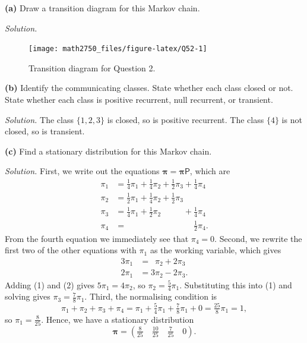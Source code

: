 \documentclass[
  a4paper,
]{article}
\theoremstyle{definition}
\theoremstyle{definition}
\theoremstyle{definition}
\theoremstyle{remark}
\begin{document}
\textbf{(a)} Draw a transition diagram for this Markov chain.

\begin{myanswers}

\emph{Solution.}

\begin{figure}

{\centering \texttt{[image: math2750\_files/figure-latex/Q52-1]} 

}

\caption{Transition diagram for Question 2.}\label{fig:Q52}
\end{figure}

\end{myanswers}

\textbf{(b)} Identify the communicating classes. State whether each class closed or not. State whether each class is positive recurrent, null recurrent, or transient.

\begin{myanswers}
\emph{Solution.} The class \(\{1,2,3\}\) is closed, so is positive recurrent. The class \(\{4\}\) is not closed, so is transient.

\end{myanswers}

\textbf{(c)} Find a stationary distribution for this Markov chain.

\begin{myanswers}
\emph{Solution.} First, we write out the equations \(\boldsymbol\pi = \boldsymbol\pi\mathsf P\), which are
\begin{align*}
\pi_1 &= \tfrac14\pi_1 + \tfrac14\pi_2 + \tfrac12\pi_3 + \tfrac14\pi_4 \\
\pi_2 &= \tfrac12\pi_1 + \tfrac14\pi_2 + \tfrac12\pi_3 \\
\pi_3 &= \tfrac14\pi_1 + \tfrac12\pi_2 \phantom{{}+\tfrac12\pi_3} + \tfrac14\pi_4 \\
\pi_4 &= \phantom{\tfrac12\pi_1 + \tfrac14\pi_2 + \tfrac12\pi_3+{}}  \tfrac12 \pi_4 .
\end{align*}
From the fourth equation we immediately see that \(\pi_4 = 0\). Second, we rewrite the first two of the other equations with \(\pi_1\) as the working variable, which gives
\begin{align}
3\pi_1 &= \phantom{3}\pi_2 + 2\pi_3 \tag{1} \\
2\pi_1 &= 3\pi_2 - 2\pi_3 \tag{2} .
\end{align}
Adding (1) and (2) gives \(5\pi_1 = 4\pi_2\), so \(\pi_2 = \frac54\pi_1\). Substituting this into (1) and solving gives \(\pi_3 = \frac78 \pi_1\). Third, the normalising condition is
\[ \pi_1 + \pi_2 + \pi_3 + \pi_4 = \pi_1 + \tfrac54\pi_1 + \tfrac78\pi_1 + 0 = \tfrac{25}{8}\pi_1 = 1, \]
so \(\pi_1 = \frac{8}{25}\). Hence, we have a stationary distribution
\[ \boldsymbol\pi = \left(\tfrac{8}{25} \quad \tfrac{10}{25} \quad \tfrac{7}{25} \quad 0 \right) .\]

\end{myanswers}
\end{document}
